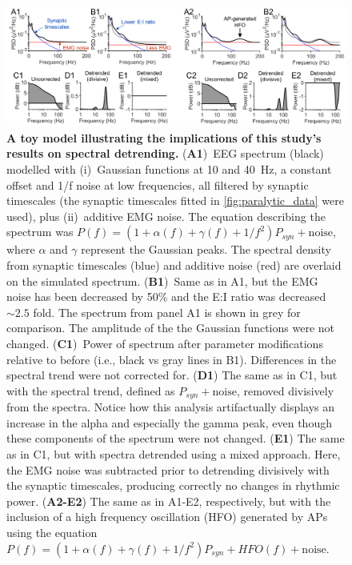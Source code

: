 \begin{figure}[t!]
    \centering
    \hspace*{-1.25cm}
    \includegraphics[width=18cm]{Figures/chapter3/figure7.png}
    \caption[A toy model illustrating implications for spectral detrending]{\textbf{A toy model illustrating the implications of this study's results on spectral detrending.} (\textbf{A1})~EEG spectrum (black) modelled with (i)~Gaussian functions at 10 and 40~\unit{\hertz}, a constant offset and 1/f noise at low frequencies, all filtered by synaptic timescales (the synaptic timescales fitted in {\autoref{fig:paralytic_data}} were used), plus (ii)~additive EMG noise. The equation describing the spectrum was $P(f)=(1+\alpha(f)+\gamma(f)+1/f^2)P_{syn}+\mathrm{noise}$, where $\alpha$ and $\gamma$ represent the Gaussian peaks. The spectral density from synaptic timescales (blue) and additive noise (red) are overlaid on the simulated spectrum. (\textbf{B1})~Same as in A1, but the EMG noise has been decreased by 50\% and the E:I ratio was decreased ${\sim}2.5$ fold. The spectrum from panel A1 is shown in grey for comparison. The amplitude of the the Gaussian functions were not changed. (\textbf{C1})~Power of spectrum after parameter modifications relative to before (i.e., black vs gray lines in B1). Differences in the spectral trend were not corrected for. (\textbf{D1}) The same as in C1, but with the spectral trend, defined as $P_{syn}+\mathrm{noise}$, removed divisively from the spectra. Notice how this analysis artifactually displays an increase in the alpha and especially the gamma peak, even though these components of the spectrum were not changed. (\textbf{E1}) The same as in C1, but with spectra detrended using a mixed approach. Here, the EMG noise was subtracted prior to detrending divisively with the synaptic timescales, producing correctly no changes in rhythmic power. (\textbf{A2-E2}) The same as in A1-E2, respectively, but with the inclusion of a high frequency oscillation (HFO) generated by APs using the equation $P(f)=(1+\alpha(f)+\gamma(f)+1/f^2)P_{syn}+HFO(f)+\mathrm{noise}$.}
    \label{fig:detrending}
\end{figure}


